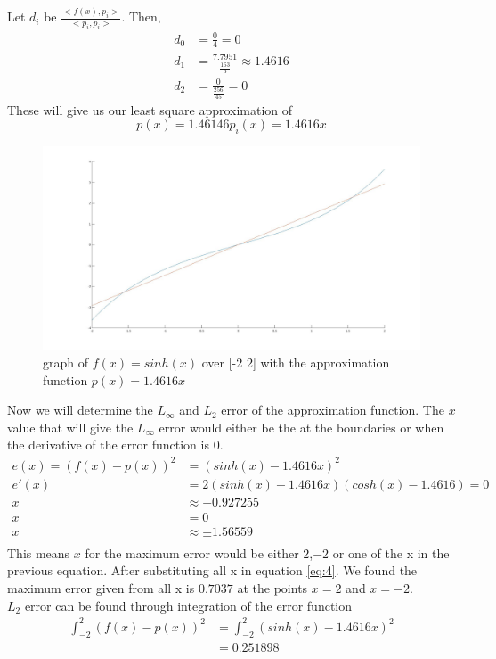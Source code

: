 \documentclass{article}
\begin{document}
Let $d_i$ be $\frac{<f(x),p_i>}{<p_i,p_i>}$. Then,
\begin{equation*}
\begin{aligned}
d_0 &= \frac{0}{4} = 0\\
d_1 &= \frac{7.7951}{\frac{163}{3}} \approx 1.4616\\
d_2 &= \frac{0}{\frac{256}{45}} = 0
\end{aligned}
\end{equation*}
These will give us our least square approximation of
\begin{equation} \label{eq:4}
p(x) = 1.46146p_i(x) = 1.4616x
\end{equation}
\begin{figure}[H]
\centering
\includegraphics[width=5in]{figures/q1d.jpg}
\caption{graph of $f(x) = sinh(x)$ over [-2 2] with the approximation function $p(x) = 1.4616x$}
\end{figure}
Now we will determine the $L_\infty$ and $L_2$ error of the approximation function. The $x$ value that will give the $L_\infty$ error would either be the at the boundaries or when the derivative of the error function is $0$.
\begin{equation*}
\begin{aligned}
e(x) = (f(x) - p(x))^2 &= (sinh(x) - 1.4616x)^2\\
e'(x) &= 2(sinh(x) - 1.4616x)(cosh(x) - 1.4616) = 0\\
x &\approx \pm 0.927255\\
x &= 0 \\
x &\approx \pm 1.56559\\
\end{aligned}
\end{equation*}
This means $x$ for the maximum error would be either $2$,$-2$ or one of the x in the previous equation. After substituting all x in equation \ref{eq:4}. We found the maximum error given from all x is $0.7037$ at the points $x = 2$ and $x = -2$.\\
$L_2$ error can be found through integration of the error function
\begin{equation*}
\begin{aligned}
\int_{-2}^2(f(x) - p(x))^2 &= \int_{-2}^2(sinh(x) - 1.4616x)^2\\
							&= 0.251898
\end{aligned}
\end{equation*}
\end{document}
